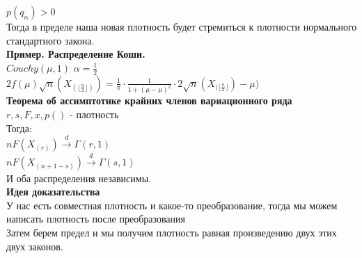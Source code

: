 \documentclass{article}
\newcommand\0{\mathbb{0}}
\newcommand\1{\mathbb{1}}
\begin{document}
$p(q_\alpha) > 0$\\
Тогда в пределе наша новая плотность будет стремиться к плотности нормального стандартного закона.\\
\textbf{Пример. Распределение Коши.}\\
$Couchy(\mu, 1)$ $\alpha = \frac{1}{2}$\\
$2f(\mu)\sqrt{n}(X_{(\lfloor \frac{n}{2} \rfloor)}) = \frac{1}{\pi} \cdot \frac{1}{1 + (\mu - \mu)^2} \cdot 2\sqrt{n}(X_{(\lfloor \frac{n}{2} \rfloor}) - \mu)$\\
\textbf{Теорема об ассимптотике крайних членов вариационного ряда}\\
$r,s,F,x,p()$ - плотность\\
Тогда:\\
$n F(X_{(r)}) \xrightarrow[]{d} \Gamma(r,1)$\\
$n F(X_{(n + 1 - s)}) \xrightarrow[]{d} \Gamma(s, 1)$\\
И оба распределения независимы.\\
\textbf{Идея доказательства}\\
У нас есть совместная плотность и какое-то преобразование, тогда мы можем написать плотность после преобразования\\
Затем берем предел и мы получим плотность равная произведению двух этих двух законов.
\end{document}
